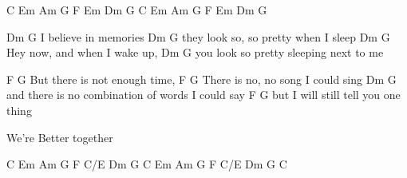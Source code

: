 C Em Am G F Em Dm G 
C Em Am G F Em Dm G 


Dm                 G
I believe in memories
              Dm                  G
they look so, so pretty when I sleep
         Dm               G 
Hey now, and when I wake up,
            Dm                       G
you look so pretty sleeping next to me

              F             G
But there is not enough time,
               F                G
There is no, no song I could sing
                 Dm               G
and there is no combination of words I could say
              F                  G
but I will still tell you one thing

We're Better together

C Em Am G F C/E Dm G 
C Em Am G F C/E Dm G
C





